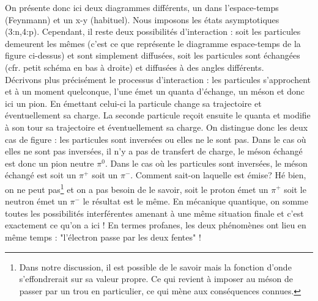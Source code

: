 On présente donc ici deux diagrammes différents, un dans l'espace-temps (Feynmann) et un x-y (habituel). Nous imposons les états asymptotiques (3:n,4:p). Cependant, il reste deux possibilités d'interaction : soit les particules demeurent les mêmes (c'est ce que représente le diagramme espace-temps de la figure ci-dessus) et sont simplement diffusées, soit les particules sont échangées (cfr. petit schéma en bas à droite) et diffusées à des angles différents.\\

Décrivons plus précisément le processus d'interaction : les particules s'approchent et à un moment quelconque, l'une émet un quanta d'échange, un méson et donc ici un pion. En émettant celui-ci la particule change sa trajectoire et éventuellement sa charge. La seconde particule reçoit ensuite le quanta et modifie à son tour sa trajectoire et éventuellement sa charge. On distingue donc les deux cas de figure : les particules sont inversées ou elles ne le sont pas. Dans le cas où elles ne sont pas inversées, il n'y a pas de transfert de charge, le méson échangé est donc un pion neutre $\pi^0$. Dans le cas où les particules sont inversées, le méson échangé est soit un $\pi^+$ soit un $\pi^-$. Comment sait-on laquelle est émise? Hé bien, on ne peut pas\footnote{Dans notre discussion, il est possible de le savoir mais la fonction d'onde s'effondrerait sur sa valeur propre. Ce qui revient à imposer au méson de passer par un trou en particulier, ce qui mène aux conséquences connues.} et on a pas besoin de le savoir, soit le proton émet un $\pi^+$ soit le neutron émet un $\pi^-$ le résultat est le même. En mécanique quantique, on somme toutes les possibilités interférentes amenant à une même situation finale et c'est exactement ce qu'on a ici ! En termes profanes, les deux phénomènes ont lieu en même temps : "l'électron passe par les deux fentes" !\\

